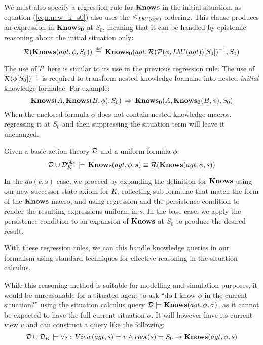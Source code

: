 We must also specify a regression rule for $\mathbf{Knows}$ in the initial
situation, as equation (\ref{eqn:new_k_s0}) also uses the $\leq_{LbU(agt)}$
ordering. This clause produces an expression in $\mathbf{Knows_{0}}$ at $S_{0}$,
meaning that it can be handled by epistemic reasoning about the initial
situation only:\begin{equation}
\mathcal{R}(\mathbf{Knows}(agt,\phi,S_{0}))\,\stackrel{\mbox{\tiny def}}{=}\,\mathbf{Knows_{0}}(agt,\mathcal{R}(\mathcal{P}(\phi,LbU(agt))[S_{0}])^{-1},S_{0})\label{eqn:R_s0}\end{equation}


The use of $\mathcal{P}$ here is similar to its use in the previous regression
rule. The use of $\mathcal{R}(\phi[S_{0}])^{-1}$ is required to transform
nested knowledge formulae into nested \emph{initial} knowledge formulae.
For example:\[
\mathbf{Knows}(A,\mathbf{Knows}(B,\phi),S_{0})\,\Rightarrow\,\mathbf{Knows_{0}}(A,\mathbf{Knows_{0}}(B,\phi),S_{0})\]
 When the enclosed formula $\phi$ does not contain nested knowledge
macros, regressing it at $S_{0}$ and then suppressing the situation
term will leave it unchanged.

\begin{thm}
\label{thm:Reg_Knows}Given a basic action theory $\mathcal{D}$ and a uniform
formula $\phi$:\[
\mathcal{D}\cup\mathcal{D}_{K}^{obs}\,\models\,\mathbf{Knows}(agt,\phi,s)\equiv\mathcal{R}(\mathbf{Knows}(agt,\phi,s))\]

\end{thm}
\begin{proofsketch}
In the $do(c,s)$ case, we proceed by expanding the definition for
$\mathbf{Knows}$ using our new successor state axiom for $K$, collecting
sub-formulae that match the form of the $\mathbf{Knows}$ macro, and using
regression and the persistence condition to render the resulting expressions
uniform in $s$. In the base case, we apply the persistence condition
to an expansion of $\mathbf{Knows}$ at $S_{0}$ to produce the desired result. 
\end{proofsketch}
With these regression rules, we can this handle knowledge queries
in our formalism using standard techniques for effective reasoning
in the situation calculus.

While this reasoning method is suitable for modelling and simulation
purposes, it would be unreasonable for a situated agent to ask {}``do
I know $\phi$ in the current situation?'' using the situation calculus
query $\mathcal{D}\models\mathbf{Knows}(agt,\phi,\sigma)$, as it cannot be
expected to have the full current situation $\sigma$. It will however
have its current view $v$ and can construct a query like the following:\[
\mathcal{D}\cup\mathcal{D}_{K}\models\forall s:\, View(agt,s)=v\wedge root(s)=S_{0}\rightarrow\mathbf{Knows}(agt,\phi,s)\]


